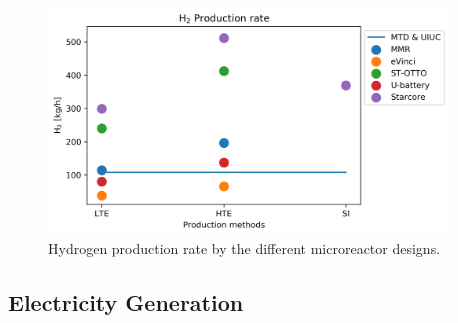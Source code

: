 \documentclass[11pt,letterpaper]{article}
\begin{document}
	\begin{figure}[htbp!]
	    \centering
		\includegraphics[height=6.0cm]{figures/reactors-by-hour1}
		\hfill
		\caption{Hydrogen production rate by the different microreactor designs.}
		\label{fig:hydro-micro}
	\end{figure}

\subsection{Electricity Generation}

\end{document}
